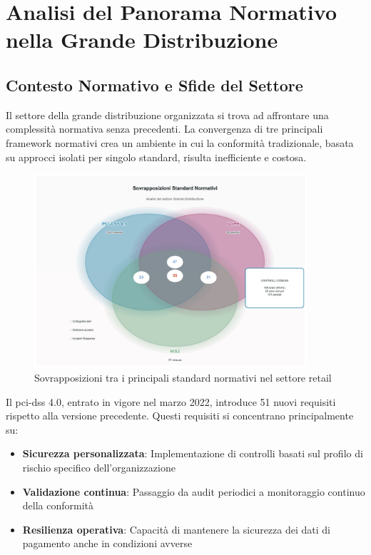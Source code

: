 \section{Analisi del Panorama Normativo nella Grande Distribuzione}
\label{sec:4.2_panorama_normativo}

\subsection{Contesto Normativo e Sfide del Settore}
\label{subsec:4.2.1_contesto}

Il settore della grande distribuzione organizzata si trova ad affrontare una complessità normativa senza precedenti. La convergenza di tre principali framework normativi crea un ambiente in cui la conformità tradizionale, basata su approcci isolati per singolo standard, risulta inefficiente e costosa.

\begin{figure}[h]
\centering

\includegraphics[width=0.9\textwidth]{thesis_figures/cap4/figura_4_1_venn_premium.pdf}

\caption{Sovrapposizioni tra i principali standard normativi nel settore retail}
\label{fig:normative_overlap}
\end{figure}

Il \gls{pci-dss} 4.0, entrato in vigore nel marzo 2022, introduce 51 nuovi requisiti rispetto alla versione precedente\autocite{pcidss2024}. Questi requisiti si concentrano principalmente su:

\begin{itemize}
    \item \textbf{Sicurezza personalizzata}: Implementazione di controlli basati sul profilo di rischio specifico dell'organizzazione
    \item \textbf{Validazione continua}: Passaggio da audit periodici a monitoraggio continuo della conformità
    \item \textbf{Resilienza operativa}: Capacità di mantenere la sicurezza dei dati di pagamento anche in condizioni avverse
\end{itemize}


